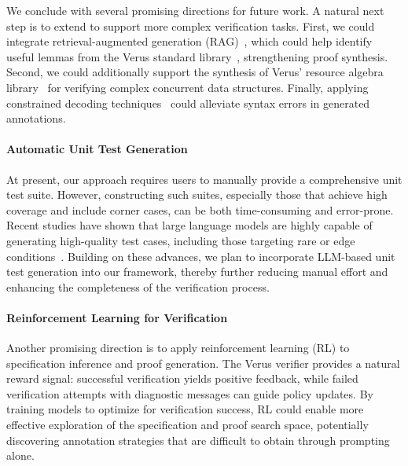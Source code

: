 We conclude with several promising directions for future work.
%
A natural next step is to extend \toolname{} to support more complex verification tasks. First, we could integrate retrieval-augmented generation (RAG)~\cite{RAG}, which could help identify useful lemmas from the Verus standard library~\cite{vstd}, strengthening proof synthesis. Second, we could additionally support the synthesis of Verus' resource algebra library~\cite{verus-practical} for verifying complex concurrent data structures. Finally, applying constrained decoding techniques~\cite{constrained-decoding} could alleviate syntax errors in generated annotations.


\paragraph{Automatic Unit Test Generation}
At present, our approach requires users to manually provide a comprehensive unit test suite. However, constructing such suites, especially those that achieve high coverage and include corner cases, can be both time-consuming and error-prone. Recent studies have shown that large language models are highly capable of generating high-quality test cases, including those targeting rare or edge conditions~\cite{highcovtest,liu2025llmpoweredtestcasegeneration}. Building on these advances, we plan to incorporate LLM-based unit test generation into our framework, thereby further reducing manual effort and enhancing the completeness of the verification process.

\paragraph{Reinforcement Learning for Verification}
Another promising direction is to apply reinforcement learning (RL) to specification inference and proof generation. The Verus verifier provides a natural reward signal: successful verification yields positive feedback, while failed verification attempts with diagnostic messages can guide policy updates. By training models to optimize for verification success, RL could enable more effective exploration of the specification and proof search space, potentially discovering annotation strategies that are difficult to obtain through prompting alone.

